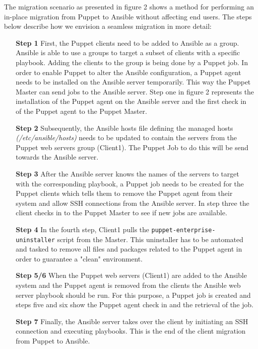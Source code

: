 \noindent
The migration scenario as presented in figure 2 shows a method for performing an in-place migration from Puppet to Ansible without affecting end users. The steps below describe how we envision a seamless migration in more detail:

\indent
\begin{itemize}
    \item[\bf Step 1] First, the Puppet clients need to be added to Ansible as a group. Ansible is able to use a groups to target a subset of clients with a specific playbook. Adding the clients to the group is being done by a Puppet job. In order to enable Puppet to alter the Ansible configuration, a Puppet agent needs to be installed on the Ansible server temporarily. This way the Puppet Master can send jobs to the Ansible server. Step one in figure 2 represents the installation of the Puppet agent on the Ansible server and the first check in of the Puppet agent to the Puppet Master.

    \item[\bf Step 2] Subsequently, the Ansible hosts file defining the managed hosts \textit{(/etc/ansible/hosts)} needs to be updated to contain the servers from the Puppet web servers group (Client1). The Puppet Job to do this will be send towards the Ansible server.

    \item[\bf Step 3] After the Ansible server knows the names of the servers to target with the corresponding playbook, a Puppet job needs to be created for the Puppet clients which tells them to remove the Puppet agent from their system and allow SSH connections from the Ansible server. In step three the client checks in to the Puppet Master to see if new jobs are available.

	\item[\bf Step 4]
    In the fourth step, Client1 pulls the \texttt{puppet-enterprise-uninstaller} script from the Master. This uninstaller has to be automated and tasked to remove all files and packages related to the Puppet agent in order to guarantee a "clean" environment.

    \item[\bf Step 5/6] When the Puppet web servers (Client1) are added to the Ansible system and the Puppet agent is removed from the clients the Ansible web server playbook should be run. For this purpose, a Puppet job is created and steps five and six show the Puppet agent check in and the retrieval of the job. 
    
    \item[\bf Step 7] Finally, the Ansible server takes over the client by initiating an SSH connection and executing playbooks. This is the end of the client migration from Puppet to Ansible.   
\end{itemize}

